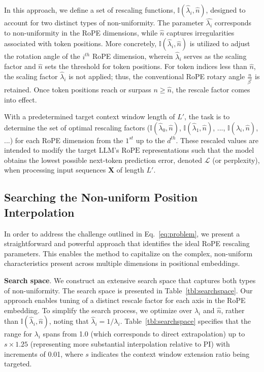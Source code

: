 In this approach, we define a set of rescaling functions, $\mathbb{I}(\hat{\lambda}_{i},\hat{n})$, designed to account for two distinct types of non-uniformity. The parameter $\hat{\lambda_i}$ corresponds to non-uniformity in the RoPE dimensions, while $\hat{n}$ captures irregularities associated with token positions. More concretely, $\mathbb{I}(\hat{\lambda}_{i},\hat{n})$ is utilized to adjust the rotation angle of the $i^{th}$ RoPE dimension, wherein $\hat\lambda_{i}$ serves as the scaling factor and $\hat{n}$ sets the threshold for token positions. For token indices less than $\hat{n}$, the scaling factor $\hat\lambda_{i}$ is not applied; thus, the conventional RoPE rotary angle $\frac{n}{\beta^i}$ is retained. Once token positions reach or surpass $n \geq \hat{n}$, the rescale factor comes into effect.

With a predetermined target context window length of $L'$, the task is to determine the set of optimal rescaling factors ($\mathbb{I}(\hat{\lambda}_{0},\hat{n})$, $\mathbb{I}(\hat{\lambda}_{1},\hat{n})$, ..., $\mathbb{I}(\hat{\lambda}_{i},\hat{n})$, ...) for each RoPE dimension from the $1^{st}$ up to the $d^{th}$. These rescaled values are intended to modify the target $\text{LLM}$’s $\text{RoPE}$ representations such that the model obtains the lowest possible next-token prediction error, denoted $\mathcal{L}$ (or perplexity), when processing input sequences $\mathbf{X}$ of length $L'$.

\subsection{Searching the Non-uniform Position Interpolation}

In order to address the challenge outlined in Eq.~\ref{eq:problem}, we present a straightforward and powerful approach that identifies the ideal RoPE rescaling parameters. This enables the method to capitalize on the complex, non-uniform characteristics present across multiple dimensions in positional embeddings.

\textbf{Search space}. We construct an extensive search space that captures both types of non-uniformity. The search space is presented in Table~\ref{tbl:searchspace}. Our approach enables tuning of a distinct rescale factor for each axis in the RoPE embedding. To simplify the search process, we optimize over $\lambda_i$ and $\hat{n}$, rather than $\mathbb{I}(\hat{\lambda}_{i},\hat{n})$, noting that $\hat{\lambda}_{i}=1/\lambda_i$. Table~\ref{tbl:searchspace} specifies that the range for $\lambda_i$ spans from 1.0 (which corresponds to direct extrapolation) up to $s\times1.25$ (representing more substantial interpolation relative to PI) with increments of 0.01, where $s$ indicates the context window extension ratio being targeted.

